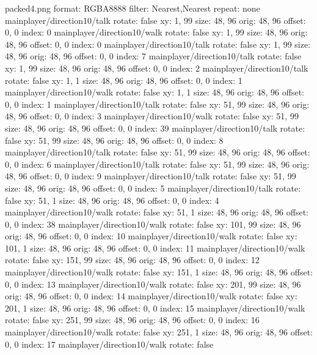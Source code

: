 packed4.png
format: RGBA8888
filter: Nearest,Nearest
repeat: none
mainplayer/direction10/talk
  rotate: false
  xy: 1, 99
  size: 48, 96
  orig: 48, 96
  offset: 0, 0
  index: 0
mainplayer/direction10/walk
  rotate: false
  xy: 1, 99
  size: 48, 96
  orig: 48, 96
  offset: 0, 0
  index: 0
mainplayer/direction10/talk
  rotate: false
  xy: 1, 99
  size: 48, 96
  orig: 48, 96
  offset: 0, 0
  index: 7
mainplayer/direction10/talk
  rotate: false
  xy: 1, 99
  size: 48, 96
  orig: 48, 96
  offset: 0, 0
  index: 2
mainplayer/direction10/talk
  rotate: false
  xy: 1, 1
  size: 48, 96
  orig: 48, 96
  offset: 0, 0
  index: 1
mainplayer/direction10/walk
  rotate: false
  xy: 1, 1
  size: 48, 96
  orig: 48, 96
  offset: 0, 0
  index: 1
mainplayer/direction10/talk
  rotate: false
  xy: 51, 99
  size: 48, 96
  orig: 48, 96
  offset: 0, 0
  index: 3
mainplayer/direction10/walk
  rotate: false
  xy: 51, 99
  size: 48, 96
  orig: 48, 96
  offset: 0, 0
  index: 39
mainplayer/direction10/talk
  rotate: false
  xy: 51, 99
  size: 48, 96
  orig: 48, 96
  offset: 0, 0
  index: 8
mainplayer/direction10/talk
  rotate: false
  xy: 51, 99
  size: 48, 96
  orig: 48, 96
  offset: 0, 0
  index: 6
mainplayer/direction10/talk
  rotate: false
  xy: 51, 99
  size: 48, 96
  orig: 48, 96
  offset: 0, 0
  index: 9
mainplayer/direction10/talk
  rotate: false
  xy: 51, 99
  size: 48, 96
  orig: 48, 96
  offset: 0, 0
  index: 5
mainplayer/direction10/talk
  rotate: false
  xy: 51, 1
  size: 48, 96
  orig: 48, 96
  offset: 0, 0
  index: 4
mainplayer/direction10/walk
  rotate: false
  xy: 51, 1
  size: 48, 96
  orig: 48, 96
  offset: 0, 0
  index: 38
mainplayer/direction10/walk
  rotate: false
  xy: 101, 99
  size: 48, 96
  orig: 48, 96
  offset: 0, 0
  index: 10
mainplayer/direction10/walk
  rotate: false
  xy: 101, 1
  size: 48, 96
  orig: 48, 96
  offset: 0, 0
  index: 11
mainplayer/direction10/walk
  rotate: false
  xy: 151, 99
  size: 48, 96
  orig: 48, 96
  offset: 0, 0
  index: 12
mainplayer/direction10/walk
  rotate: false
  xy: 151, 1
  size: 48, 96
  orig: 48, 96
  offset: 0, 0
  index: 13
mainplayer/direction10/walk
  rotate: false
  xy: 201, 99
  size: 48, 96
  orig: 48, 96
  offset: 0, 0
  index: 14
mainplayer/direction10/walk
  rotate: false
  xy: 201, 1
  size: 48, 96
  orig: 48, 96
  offset: 0, 0
  index: 15
mainplayer/direction10/walk
  rotate: false
  xy: 251, 99
  size: 48, 96
  orig: 48, 96
  offset: 0, 0
  index: 16
mainplayer/direction10/walk
  rotate: false
  xy: 251, 1
  size: 48, 96
  orig: 48, 96
  offset: 0, 0
  index: 17
mainplayer/direction10/walk
  rotate: false
